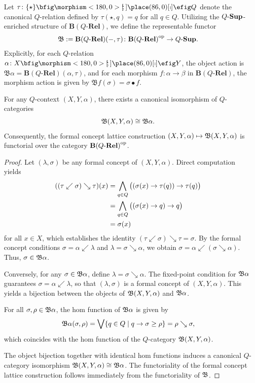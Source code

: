 \documentclass{tac}
\begin{document}
Let $\tau\colon\sigt\nto Q$ denote the canonical $Q$-relation defined by $\tau(\star,q)=q$ for all $q\in Q$. Utilizing the ${Q\text{-}\mathbf{Sup}}$-enriched structure of $\mathbf{B}(Q\text{-}\mathbf{Rel})$, we define the representable functor
\[
\mathfrak{B}:=\mathbf{B}(Q\text{-}\mathbf{Rel})(-,\tau)\colon{\mathbf{B}(Q\text{-}\mathbf{Rel})}^{\mathrm{op}}\to{Q\text{-}\mathbf{Sup}}.
\]
Explicitly, for each $Q$-relation $\alpha\colon X\nto Y$, the object action is $\mathfrak{B}\alpha=\mathbf{B}(Q\text{-}\mathbf{Rel})(\alpha,\tau)$, and for each morphism $f\colon\alpha\to\beta$ in $\mathbf{B}(Q\text{-}\mathbf{Rel})$, the morphism action is given by $\mathfrak{B}f(\sigma)=\sigma\bullet f$.

\begin{theorem}
For any $Q$-context $(X,Y,\alpha)$, there exists a canonical isomorphism of $Q$-categories
\[
\mathfrak{B}(X,Y,\alpha)\cong\mathfrak{B}\alpha.
\]
Consequently, the formal concept lattice construction $(X,Y,\alpha)\mapsto\mathfrak{B}(X,Y,\alpha)$ is functorial over the category ${\mathbf{B}(Q\text{-}\mathbf{Rel})}^{\mathrm{op}}$.
\end{theorem}

\begin{proof}
Let $(\lambda,\sigma)$ be any formal concept of $(X,Y,\alpha)$. Direct computation yields
\[
\begin{aligned}
((\tau\swarrow\sigma)\searrow\tau)(x)
&=\bigwedge_{q\in Q}\big((\sigma(x)\ra\tau(q))\ra\tau(q)\big)\\
&=\bigwedge_{q\in Q}\big((\sigma(x)\ra q)\ra q\big)\\
&=\sigma(x)
\end{aligned}
\]
for all $x\in X$, which establishes the identity $(\tau\swarrow\sigma)\searrow\tau=\sigma$. By the formal concept conditions $\sigma=\alpha\swarrow\lambda$ and $\lambda=\sigma\searrow\alpha$, we obtain $\sigma=\alpha\swarrow(\sigma\searrow\alpha)$. Thus, $\sigma\in\mathfrak{B}\alpha$.

Conversely, for any $\sigma\in\mathfrak{B}\alpha$, define $\lambda=\sigma\searrow\alpha$. The fixed-point condition for $\mathfrak{B}\alpha$ guarantees $\sigma=\alpha\swarrow\lambda$, so that $(\lambda,\sigma)$ is a formal concept of $(X,Y,\alpha)$. This yields a bijection between the objects of $\mathfrak{B}(X,Y,\alpha)$ and $\mathfrak{B}\alpha$.

For all \(\sigma,\rho\in\mathfrak{B}\alpha\), the hom function of \(\mathfrak{B}\alpha\) is given by
\[
\mathfrak{B}\alpha(\sigma,\rho)
=\bigvee\{q\in Q\mid q\rightarrow\sigma\geq\rho\}
=\rho\searrow\sigma,
\]
which coincides with the hom function of the \(Q\)-category \(\mathfrak{B}(X,Y,\alpha)\).

The object bijection together with identical hom functions induces a canonical $Q$-category isomorphism $\mathfrak{B}(X,Y,\alpha)\cong\mathfrak{B}\alpha$. The functoriality of the formal concept lattice construction follows immediately from the functoriality of $\mathfrak{B}$.
\end{proof}
\end{document}
